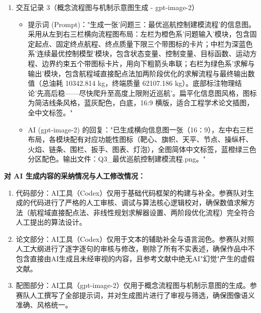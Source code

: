 \documentclass[withoutpreface,bwprint]{cumcmthesis}
\begin{document}
\begin{enumerate}[leftmargin=*]
\begin{itemize}
    \end{itemize}
    \item 交互记录 3（概念流程图与机制示意图生成 - gpt-image-2）
    \begin{itemize}
    \item 提示词 (Prompt)："生成一张'问题三：最优巡航控制建模流程'的信息图。采用从左到右三栏横向流程图布局：左栏为橙色系'问题输入'模块，包含固定起点、固定终点航程、终点质量下限三个带图标的卡片；中栏为深蓝色系'连续最优控制模型'模块，包含状态变量、控制变量、目标函数、运动方程、边界约束五个带图标卡片，用向下粗箭头串联；右栏为绿色系'求解与输出'模块，包含航程域直接配点法加两阶段优化的求解流程与最终输出数值（总油耗 10342.814 kg，终端质量 62107.186 kg）。底部标注物理结论'先高后稳——尽快爬升至高度上限附近巡航'。扁平化信息图风格，图标为简洁线条风格，蓝灰配色，白底，16:9 横版，适合工程学术论文插图，全中文标签。"
    \item AI (gpt-image-2) 的回复："已生成横向信息图一张（16∶9），左中右三栏布局，各模块配有对应功能性图标（靶心、旗帜、天平、节点、操纵杆、火焰、链条、围栏、扳手、图表、灯泡），全图简体中文标签，蓝橙绿三色分区配色。输出文件：Q3\_最优巡航控制建模流程.png。"
    \end{itemize}
\end{enumerate}

\textbf{对 AI 生成内容的采纳情况与人工修改情况：}
\begin{enumerate}[leftmargin=*]
    \item 代码部分：AI工具（Codex）仅用于基础代码框架的构建与补全。参赛队对生成的代码进行了严格的人工审核、调试与算法核心逻辑校对，确保数值求解方法（航程域直接配点法、非线性规划求解器设置、两阶段优化流程）完全符合人工提出的算法设计。
    \item 论文部分：AI工具（Codex）仅用于文本的辅助补全与语言润色。参赛队对照人工大纲进行了逐字逐句的审核与修改，剔除了所有不实表述，确保作品中不包含直接由AI生成且未经审视的内容，且参考文献中绝无AI"幻觉"产生的虚假文献。
    \item 配图部分：AI工具（gpt-image-2）仅用于概念流程图与机制示意图的生成。参赛队人工撰写了全部提示词，并对生成图片进行了审视与筛选，确保图像语义准确、风格统一。
\end{enumerate}

\newpage
\end{document}
